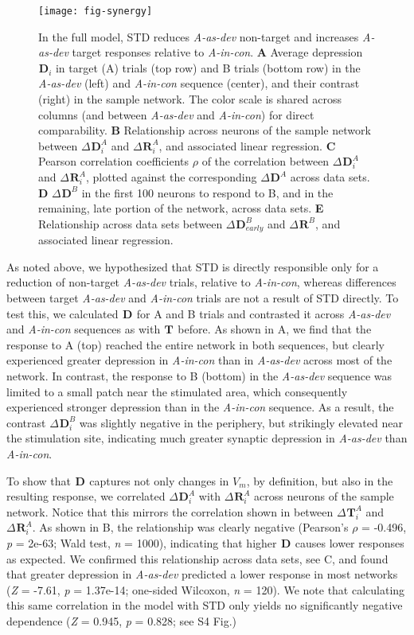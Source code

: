 \documentclass[9pt,lineno,onehalfspacing]{elife}
\newcommand{\dev}{\textit{A-as-dev}}
\newcommand{\msc}{\textit{A-in-con}}
\newcommand{\R}[3][]{{}^{#1}_{}\boldsymbol R^{#2}_{#3}}
\newcommand{\T}[3][]{{}^{#1}_{}\boldsymbol T^{#2}_{#3}}
\newcommand{\D}[3][]{{}^{#1}_{}\boldsymbol D^{#2}_{#3}}
\begin{document}
\begin{figure}
    \texttt{[image: fig-synergy]}
    \caption{%
        In the full model, STD reduces \dev{} non-target and increases \dev{} target responses relative to \msc{}.
        \textbf{A} Average depression $\D{}{i}$ in target (A) trials (top row) and B trials (bottom row) in the \dev{} (left) and \msc{} sequence (center), and their contrast (right) in the sample network. The color scale is shared across columns (and between \dev{} and \msc{}) for direct comparability.
        \textbf{B} Relationship across neurons of the sample network between $\Delta \D{A}{i}$ and $\Delta \R{A}{i}$, and associated linear regression.
        \textbf{C} Pearson correlation coefficients $\rho$ of the correlation between $\Delta \D{A}{i}$ and $\Delta \R{A}{i}$, plotted against the corresponding $\Delta \D{A}{}$ across data sets.
        \textbf{D} $\Delta \D{B}{}$ in the first 100 neurons to respond to B, and in the remaining, late portion of the network, across data sets.
        \textbf{E} Relationship across data sets between $\Delta \D{B}{early}$ and $\Delta \R{B}{}$, and associated linear regression.
    }
    \label{fig:synergy}
\end{figure}

As noted above, we hypothesized that STD is directly responsible only for a reduction of non-target \dev{} trials, relative to \msc{}, whereas differences between target \dev{} and \msc{} trials are not a result of STD directly. To test this, we calculated $\D{}{}$ for A and B trials and contrasted it across \dev{} and \msc{} sequences as with $\T{}{}$ before.
As shown in A, we find that the response to A (top) reached the entire network in both sequences, but clearly experienced greater depression in \msc{} than in \dev{} across most of the network. In contrast, the response to B (bottom) in the \dev{} sequence was limited to a small patch near the stimulated area, which consequently experienced stronger depression than in the \msc{} sequence. As a result, the contrast $\Delta \D{B}{i}$ was slightly negative in the periphery, but strikingly elevated near the stimulation site, indicating much greater synaptic depression in \dev{} than \msc{}.

To show that $\D{}{}$ captures not only changes in $V_m$, by definition, but also in the resulting response, we correlated $\Delta \D{A}{i}$ with $\Delta \R{A}{i}$ across neurons of the sample network. Notice that this mirrors the correlation shown in  between $\Delta \T{A}{i}$ and $\Delta \R{A}{i}$. As shown in B, the relationship was clearly negative (Pearson's $\rho$ = -0.496, \textit{p} = 2e-63; Wald test, \textit{n} = 1000), indicating that higher $\D{}{}$ causes lower responses as expected. We confirmed this relationship across data sets, see C, and found that greater depression in \dev{} predicted a lower response in most networks (\textit{Z} = -7.61, \textit{p} = 1.37e-14; one-sided Wilcoxon, \textit{n} = 120). We note that calculating this same correlation in the model with STD only yields no significantly negative dependence (\textit{Z} = 0.945, \textit{p} = 0.828; see S4 Fig.)
\end{document}
